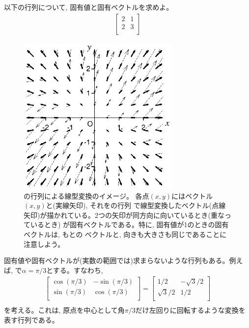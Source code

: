 \begin{q}\label{q:matrix_eigen2D0} 以下の行列について, 固有値と固有ベクトルを求めよ。
\begin{eqnarray} \begin{bmatrix}
2 & 1\\
2 & 3\\
\end{bmatrix}\label{eq:matrix_lintrans_mondai}\end{eqnarray}
\end{q}\mv


\begin{figure}[ht]
    \centering
    \includegraphics[width=8cm]{eigen.eps}
    \caption{の行列による線型変換のイメージ。
各点$(x, y)$にはベクトル$(x, y)$と(実線矢印), それをの行列
で線型変換したベクトル(点線矢印)が描かれている。2つの矢印が同方向に向いているとき(重なっているとき)
が固有ベクトルである。特に, 固有値が1のときの固有ベクトルは, もとの
ベクトルと, 向きも大きさも同じであることに注意しよう。}
\end{figure}
\mv

固有値や固有ベクトルが(実数の範囲では)求まらないような行列もある。例えば, 
で$\alpha=\pi/3$とする。すなわち, 
\begin{eqnarray}
\begin{bmatrix}
\cos (\pi/3) & -\sin (\pi/3)\\
\sin (\pi/3) & \cos (\pi/3)\\
\end{bmatrix}
=\begin{bmatrix}
1/2 & -\sqrt{3}/2\\
\sqrt{3}/2 & 1/2\\
\end{bmatrix}\nonumber\\
\label{eq:matrix_lintrans_rot_pi_3}
\end{eqnarray}
を考える。これは, 原点を中心として角$\pi/3$だけ左回りに回転するような変換を表す行列である。

